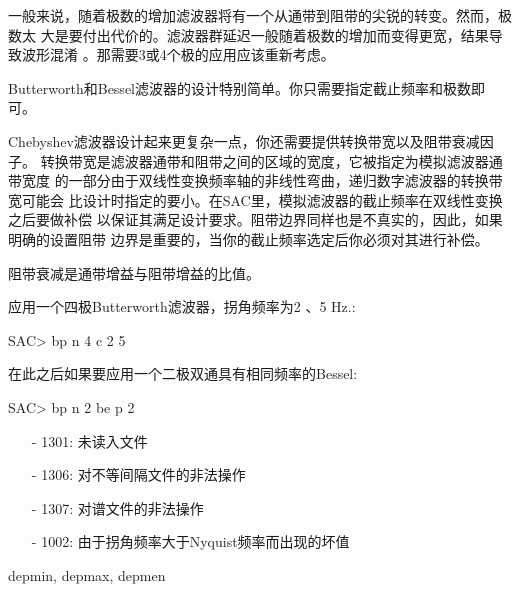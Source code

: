 一般来说，随着极数的增加滤波器将有一个从通带到阻带的尖锐的转变。然而，极数太
大是要付出代价的。滤波器群延迟一般随着极数的增加而变得更宽，结果导致波形混淆
。那需要3或4个极的应用应该重新考虑。

Butterworth和Bessel滤波器的设计特别简单。你只需要指定截止频率和极数即可。

Chebyshev滤波器设计起来更复杂一点，你还需要提供转换带宽以及阻带衰减因子。
转换带宽是滤波器通带和阻带之间的区域的宽度，它被指定为模拟滤波器通带宽度
的一部分由于双线性变换频率轴的非线性弯曲，递归数字滤波器的转换带宽可能会
比设计时指定的要小。在SAC里，模拟滤波器的截止频率在双线性变换之后要做补偿
以保证其满足设计要求。阻带边界同样也是不真实的，因此，如果明确的设置阻带
边界是重要的，当你的截止频率选定后你必须对其进行补偿。

阻带衰减是通带增益与阻带增益的比值。

应用一个四极Butterworth滤波器，拐角频率为2 、5 Hz.:
\begin{SACCode}
SAC> bp n 4 c 2 5
\end{SACCode}

在此之后如果要应用一个二极双通具有相同频率的Bessel:
\begin{SACCode}
SAC> bp n 2 be p 2
\end{SACCode}

\begin{itemize}
\item[-]1301: 未读入文件
\item[-]1306: 对不等间隔文件的非法操作
\item[-]1307: 对谱文件的非法操作
\item[-]1002: 由于拐角频率大于Nyquist频率而出现的坏值
\end{itemize}

depmin, depmax, depmen

